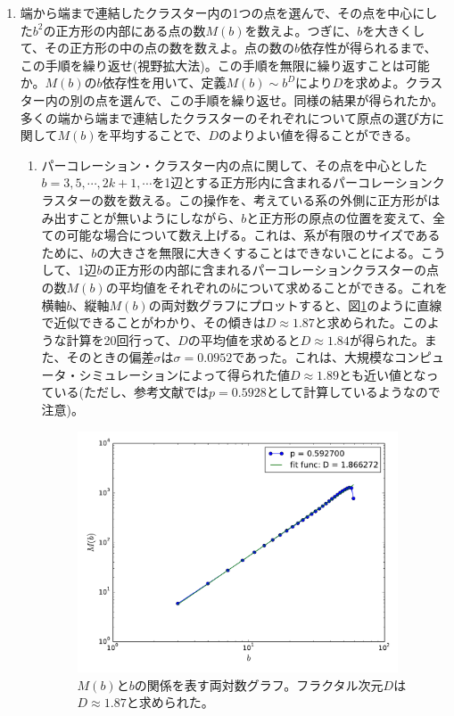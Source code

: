 \documentclass{jsarticle}
\begin{document}
\begin{enumerate}
\begin{enumerate}
\begin{figure}[H]
                    \end{figure}

                    
                \end{enumerate}    
                \item 端から端まで連結したクラスター内の1つの点を選んで、その点を中心にした$b^{2}$の正方形の内部にある点の数$M(b)$を数えよ。つぎに、$b$を大きくして、その正方形の中の点の数を数えよ。点の数の$b$依存性が得られるまで、この手順を繰り返せ(視野拡大法)。この手順を無限に繰り返すことは可能か。$M(b)$の$b$依存性を用いて、定義$M(b) \sim b^{D}$により$D$を求めよ。クラスター内の別の点を選んで、この手順を繰り返せ。同様の結果が得られたか。多くの端から端まで連結したクラスターのそれぞれについて原点の選び方に関して$M(b)$を平均することで、$D$のよりよい値を得ることができる。
                \begin{enumerate}
                    \item パーコレーション・クラスター内の点に関して、その点を中心とした$b=3, 5, \cdots, 2k+1, \cdots$を1辺とする正方形内に含まれるパーコレーションクラスターの数を数える。この操作を、考えている系の外側に正方形がはみ出すことが無いようにしながら、$b$と正方形の原点の位置を変えて、全ての可能な場合について数え上げる。これは、系が有限のサイズであるために、$b$の大きさを無限に大きくすることはできないことによる。こうして、1辺$b$の正方形の内部に含まれるパーコレーションクラスターの点の数$M(b)$の平均値をそれぞれの$b$について求めることができる。これを横軸$b$、縦軸$M(b)$の両対数グラフにプロットすると、図\ref{fig:14-1-f2}のように直線で近似できることがわかり、その傾きは$D\approx 1.87$と求められた。このような計算を20回行って、$D$の平均値を求めると$D\approx 1.84$が得られた。また、そのときの偏差$\sigma$は$\sigma = 0.0952$であった。これは、大規模なコンピュータ・シミュレーションによって得られた値$D\approx 1.89$とも近い値となっている\cite{cite2}(ただし、参考文献では$p=0.5928$として計算しているようなので注意)。
                    
                   
                    \begin{figure}[H]
                        \begin{center}
                            \includegraphics[width=9.5cm]{figure_2.pdf}
                            \caption{$M(b)$と$b$の関係を表す両対数グラフ。フラクタル次元$D$は$D\approx 1.87$と求められた。}
                            \label{fig:14-1-f2}
                        \end{center}


\end{figure}
\end{enumerate}
\end{enumerate}
\end{document}
